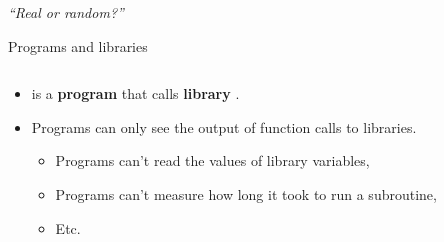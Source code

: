 \documentclass[aspectratio=169, lualatex, handout]{beamer}
\begin{document}
\begin{frame}
	\begin{center}
		\huge \textit{``Real or random?''}
	\end{center}
\end{frame}

\begin{frame}{Programs and libraries}
	\begin{columns}[c]
		\begin{column}{0.5\textwidth}
			\begin{itemize}
				\item \prog{} is a \textbf{program} that calls \textbf{library} .
				\item Programs can only see the output of function calls to libraries.
				      \begin{itemize}
					      \item Programs can't read the values of library variables,
					      \item Programs can't measure how long it took to run a subroutine,
					      \item Etc.
				      \end{itemize}
			\end{itemize}
		\end{column}
		\begin{column}{0.5\textwidth}
		\end{column}
	\end{columns}
\end{frame}
\end{document}
